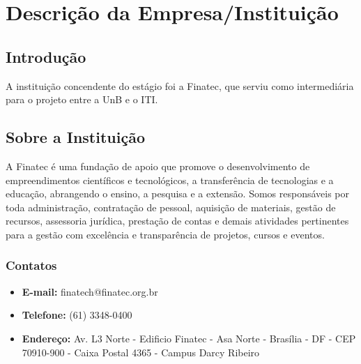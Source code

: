 \chapter[Descrição da Empresa/Instituição]{Descrição da Empresa/Instituição}


\section{Introdução}

A instituição concendente do estágio foi a Finatec, que serviu como intermediária para o projeto entre a UnB e o ITI.

\section{Sobre a Instituição}

A Finatec é uma fundação de apoio que promove o desenvolvimento de empreendimentos científicos e tecnológicos,
a transferência de tecnologias e a educação, abrangendo o ensino, a pesquisa e a extensão. Somos responsáveis por toda administração,
contratação de pessoal, aquisição de materiais, gestão de recursos, assessoria jurídica, prestação de
contas e demais atividades pertinentes para a gestão com excelência e transparência de projetos, cursos e eventos.

\subsection{Contatos}

\begin{itemize}
\item \textbf{E-mail:} finatech@finatec.org.br
\item \textbf{Telefone:} (61) 3348-0400
\item \textbf{Endereço:} Av. L3 Norte - Edificio Finatec - Asa Norte - Brasília - DF - CEP 70910-900 - Caixa Postal 4365 - Campus Darcy Ribeiro
\end{itemize}
